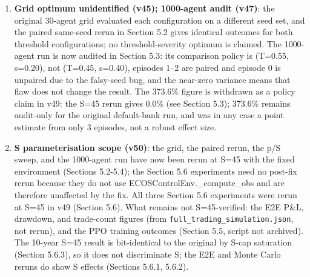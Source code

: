 \documentclass[11pt]{article}
\begin{document}
\begin{enumerate}
\item \textbf{Grid optimum unidentified (v45); 1000-agent audit (v47)}: the original 30-agent grid evaluated each configuration on a different seed set, and the paired same-seed rerun in Section 5.2 gives identical outcomes for both threshold configurations; no threshold-severity optimum is claimed. The 1000-agent run is now audited in Section 5.3: its comparison policy is (T=0.55, s=0.20), not (T=0.45, s=0.40), episodes 1--2 are paired and episode 0 is unpaired due to the falsy-seed bug, and the near-zero variance means that flaw does not change the result. The 373.6\% figure is withdrawn as a policy claim in v49: the S=45 rerun gives 0.0\% (see Section 5.3); 373.6\% remains audit-only for the original default-bank run, and was in any case a point estimate from only 3 episodes, not a robust effect size.
\item \textbf{S parameterisation scope (v50)}: the grid, the paired rerun, the p/S sweep, and the 1000-agent run have now been rerun at S=45 with the fixed environment (Sections 5.2-5.4); the Section 5.6 experiments need no post-fix rerun because they do not use ECOSControlEnv.\_compute\_obs and are therefore unaffected by the fix. All three Section 5.6 experiments were rerun at S=45 in v49 (Section 5.6). What remains not S=45-verified: the E2E P\&L, drawdown, and trade-count figures (from \texttt{full\_trading\_simulation.json}, not rerun), and the PPO training outcomes (Section 5.5, script not archived). The 10-year S=45 result is bit-identical to the original by S-cap saturation (Section 5.6.3), so it does not discriminate S; the E2E and Monte Carlo reruns do show S effects (Sections 5.6.1, 5.6.2).

\end{enumerate}
\end{document}
